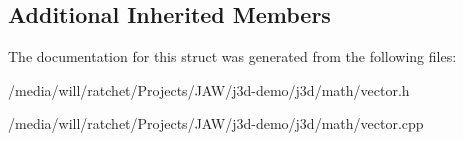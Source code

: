 \subsection*{Additional Inherited Members}


The documentation for this struct was generated from the following files\+:\begin{DoxyCompactItemize}
\item 
/media/will/ratchet/\+Projects/\+J\+A\+W/j3d-\/demo/j3d/math/vector.\+h\item 
/media/will/ratchet/\+Projects/\+J\+A\+W/j3d-\/demo/j3d/math/vector.\+cpp\end{DoxyCompactItemize}
